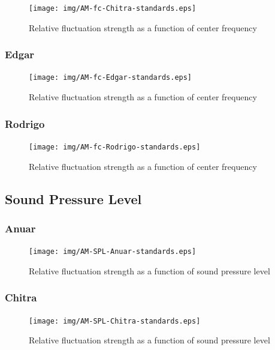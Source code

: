 \documentclass[a4paper]{article}
\begin{document}
\begin{figure}[H]
  \centering
  \texttt{[image: img/AM-fc-Chitra-standards.eps]}
  \caption{Relative fluctuation strength as a function of center frequency}
\label{fig:fc-chitra}
\end{figure}

\subsubsection{Edgar}

\begin{figure}[H]
  \centering
  \texttt{[image: img/AM-fc-Edgar-standards.eps]}
  \caption{Relative fluctuation strength as a function of center frequency}
\label{fig:fc-edgar}
\end{figure}

\subsubsection{Rodrigo}

\begin{figure}[H]
  \centering
  \texttt{[image: img/AM-fc-Rodrigo-standards.eps]}
  \caption{Relative fluctuation strength as a function of center frequency}
\label{fig:fc-rodrigo}
\end{figure}

\subsection{Sound Pressure Level}

\subsubsection{Anuar}

\begin{figure}[H]
  \centering
  \texttt{[image: img/AM-SPL-Anuar-standards.eps]}
  \caption{Relative fluctuation strength as a function of sound pressure level}
\label{fig:SPL-anuar}
\end{figure}

\subsubsection{Chitra}

\begin{figure}[H]
  \centering
  \texttt{[image: img/AM-SPL-Chitra-standards.eps]}
  \caption{Relative fluctuation strength as a function of sound pressure level}
\label{fig:SPL-chitra}
\end{figure}
\end{document}
